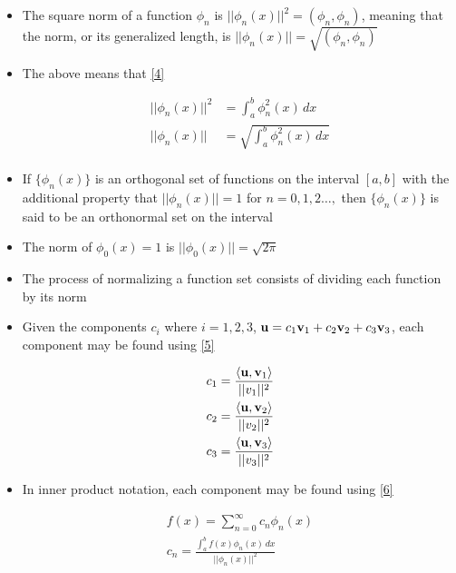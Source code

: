 \documentclass[12pt]{article}
\begin{document}
\begin{itemize}
  \item The square norm of a function $\phi_n$ is $||\phi_n(x)||^2=(\phi_n,\phi_n)$, meaning that the norm, or its generalized length, is $||\phi_n(x)||=\sqrt{(\phi_n,\phi_n)}$

  \item The above means that \eqref{4}

    \begin{equation}
      \begin{split}
        ||\phi_n(x)||^2&=\int_a^b \phi_n^2(x)\,dx\\
        ||\phi_n(x)||&=\sqrt{\int_a^b \phi_n^2(x)\,dx}\\
    \end{split}
      \label{4}
    \end{equation}

  \item If $\{\phi_n(x)\}$ is an orthogonal set of functions on the interval $[a,b]$ with the additional property that $||\phi_n(x)||=1$ for $n=0,1,2\dots,$ then $\{\phi_n(x)\}$ is said to be an orthonormal set on the interval

  \item The norm of $\phi_0(x)=1$ is $||\phi_0(x)||=\sqrt{2\pi}$

  \item The process of normalizing a function set consists of dividing each function by its norm

  \item Given the components $c_i$ where $i=1,2,3$, $\bold{u}=c_1\bold{v}_1+c_2\bold{v}_2+c_3\bold{v}_3$, each component may be found using \eqref{5}

    \begin{equation}
      \begin{split}
        c_1&=\frac{\langle\bold{u},\bold{v}_1\rangle}{||v_1||^2}\\
        c_2&=\frac{\langle\bold{u},\bold{v}_2\rangle}{||v_2||^2}\\
        c_3&=\frac{\langle\bold{u},\bold{v}_3\rangle}{||v_3||^2}\\
      \end{split}
      \label{5}
    \end{equation}

  \item In inner product notation, each component may be found using \eqref{6}

    \begin{equation}
      \begin{split}
      f(x)=\sum_{n=0}^{\infty}c_n\phi_n(x)\\
      c_n=\frac{\int_a^bf(x)\phi_n(x)\,dx}{||\phi_n(x)||^2}
    \end{split}
      \label{6}
    \end{equation}


\end{itemize}
\end{document}
